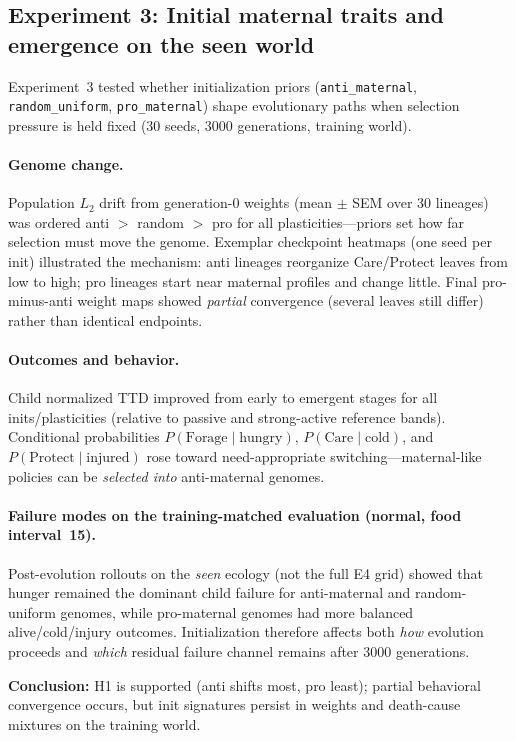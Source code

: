 \subsection{Experiment 3: Initial maternal traits and emergence on the seen world}
Experiment~3 tested whether initialization priors (\texttt{anti\_maternal}, \texttt{random\_uniform}, \texttt{pro\_maternal}) shape evolutionary paths when selection pressure is held fixed (30 seeds, 3000 generations, training world).

\paragraph{Genome change.}
Population $L_2$ drift from generation-0 weights (mean $\pm$ SEM over 30 lineages) was ordered anti $>$ random $>$ pro for all plasticities---priors set how far selection must move the genome.
Exemplar checkpoint heatmaps (one seed per init) illustrated the mechanism: anti lineages reorganize Care/Protect leaves from low to high; pro lineages start near maternal profiles and change little.
Final pro-minus-anti weight maps showed \emph{partial} convergence (several leaves still differ) rather than identical endpoints.

\paragraph{Outcomes and behavior.}
Child normalized TTD improved from early to emergent stages for all inits/plasticities (relative to passive and strong-active reference bands).
Conditional probabilities $P(\text{Forage}\mid\text{hungry})$, $P(\text{Care}\mid\text{cold})$, and $P(\text{Protect}\mid\text{injured})$ rose toward need-appropriate switching---maternal-like policies can be \emph{selected into} anti-maternal genomes.

\paragraph{Failure modes on the training-matched evaluation (normal, food interval~15).}
Post-evolution rollouts on the \emph{seen} ecology (not the full E4 grid) showed that hunger remained the dominant child failure for anti-maternal and random-uniform genomes, while pro-maternal genomes had more balanced alive/cold/injury outcomes.
Initialization therefore affects both \emph{how} evolution proceeds and \emph{which} residual failure channel remains after 3000 generations.

\textbf{Conclusion:} H1 is supported (anti shifts most, pro least); partial behavioral convergence occurs, but init signatures persist in weights and death-cause mixtures on the training world.

